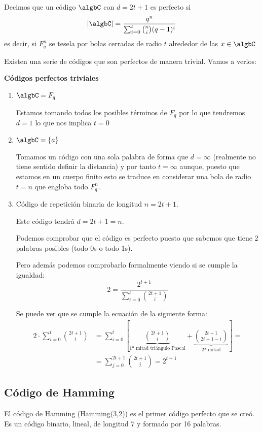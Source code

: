 \begin{defn}
Decimos que un código $\algbC$ con $d=2t+1$ es perfecto si
\[|\algbC| = \frac{q^n}{\sum_{i=0}^t {n \choose i} (q-1)^i}\]
es decir, si $F_q^n$ se tesela por bolas cerradas de radio $t$ alrededor de las $x \in \algbC$
\end{defn}

Existen una serie de códigos que son perfectos de manera trivial. Vamos a verlos:

\textbf{Códigos perfectos triviales}
\begin{enumerate}
\item $\algbC=F_q$

Estamos tomando todos los posibles términos de $F_q$ por lo que tendremos $d=1$ lo que nos implica $t=0$

\item $\algbC=\{a\}$

Tomamos un código con una sola palabra de forma que $d=\infty$ (realmente no tiene sentido definir la distancia) y por tanto $t=\infty$ aunque, puesto que estamos en un cuerpo finito esto se traduce en considerar una bola de radio $t=n$ que engloba todo $F_q^n$.

\item Código de repetición binaria de longitud $n=2t+1$.

Este código tendrá $d=2t+1 =n$.

Podemos comprobar que el código es perfecto puesto que sabemos que tiene 2 palabras posibles (todo 0s o todo 1s).

Pero además podemos comprobarlo formalmente viendo si se cumple la igualdad:
\[ 2 = \frac{2^{t+1}}{\sum_{i=0}^t {2t+1 \choose i} } \]

Se puede ver que se cumple la ecuación de la siguiente forma:
\begin{align*}
    2·\sum_{i=0}^t {2t+1 \choose i} &= \sum_{i=0}^t \left[ \underbrace{2t+1 \choose i}_{\text{1ª mitad triángulo Pascal}} + \underbrace{2t+1 \choose 2t+1-i}_{\text{2ª mitad}} \right] = \\
    &= \sum_{j=0}^{2t+1}{2t+1 \choose j} = 2^{t+1}
\end{align*}

\end{enumerate}

\subsection{Código de Hamming}
\begin{defn}\label{def:codigo_hamming}
El código de Hamming (Hamming(3,2)) es el primer código perfecto que se creó. Es un código binario, lineal, de longitud 7 y formado por 16 palabras.
\end{defn}

